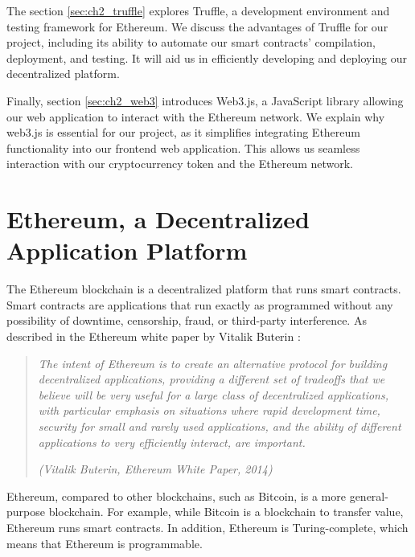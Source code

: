 The section \ref{sec:ch2_truffle} explores Truffle, a development environment and testing framework for Ethereum. We discuss the advantages of Truffle
for our project, including its ability to automate our smart contracts' compilation, deployment, and testing. It will aid us in efficiently developing
and deploying our decentralized platform.

Finally, section \ref{sec:ch2_web3} introduces Web3.js, a JavaScript library allowing our web application to interact with the Ethereum network.
We explain why web3.js is essential for our project, as it simplifies integrating Ethereum functionality into our frontend web application.
This allows us seamless interaction with our cryptocurrency token and the Ethereum network.


\section{Ethereum, a Decentralized Application Platform}
\label{sec:ch2_ethereum}

The Ethereum blockchain is a decentralized platform that runs smart contracts. Smart contracts are applications that run exactly as programmed
without any possibility of downtime, censorship, fraud, or third-party interference. As described in the Ethereum white paper by Vitalik Buterin \cite{ethereum_white_paper}:
\begin{quote}
    \textit{The intent of Ethereum is to create an alternative protocol for building decentralized applications, providing a different set of tradeoffs that we
        believe will be very useful for a large class of decentralized applications, with particular emphasis on situations where rapid development time,
        security for small and rarely used applications, and the ability of different applications to very efficiently interact, are important.}


    \textit{(Vitalik Buterin, Ethereum White Paper, 2014)}
\end{quote}


Ethereum, compared to other blockchains, such as Bitcoin, is a more general-purpose blockchain. For example, while Bitcoin is a blockchain to transfer
value, Ethereum runs smart contracts. In addition, Ethereum is Turing-complete, which means that Ethereum is programmable.




